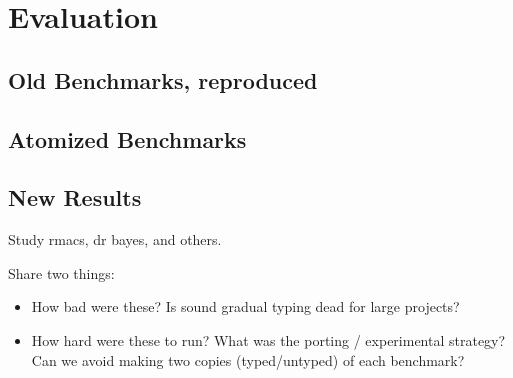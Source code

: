 \section{Evaluation}

\subsection{Old Benchmarks, reproduced}

\subsection{Atomized Benchmarks}

\subsection{New Results}
Study rmacs, dr bayes, and others.

Share two things:
\begin{itemize}
\item
  How bad were these?
  Is sound gradual typing dead for large projects?
\item
  How hard were these to run?
  What was the porting / experimental strategy?
  Can we avoid making two copies (typed/untyped) of each benchmark?
\end{itemize}

